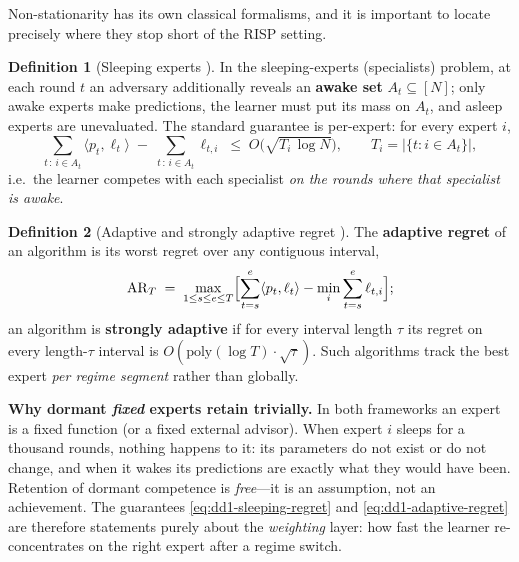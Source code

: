 \documentclass[11pt,a4paper]{article}
\theoremstyle{definition}
\newtheorem{definition}{Definition}[section]
\theoremstyle{plain}
\newcommand{\nm}{\textsc{RISP}}
\begin{document}
Non-stationarity has its own classical formalisms, and it is important to
locate precisely where they stop short of the \nm{} setting.

\begin{definition}[Sleeping experts \cite{freund1997sleeping}]
\label{def:dd1-sleeping}
In the sleeping-experts (specialists) problem, at each round $t$ an
adversary additionally reveals an \textbf{awake set} $A_t \subseteq [N]$;
only awake experts make predictions, the learner must put its mass on $A_t$,
and asleep experts are unevaluated. The standard guarantee is per-expert: for
every expert $i$,
\begin{equation}
\label{eq:dd1-sleeping-regret}
\sum_{t \,:\, i \in A_t} \langle p_t, \ell_t \rangle
\;-\; \sum_{t \,:\, i \in A_t} \ell_{t,i}
\;\le\; O\bigl( \sqrt{ T_i \,\log N } \bigr),
\qquad T_i = |\{ t : i \in A_t \}|,
\end{equation}
i.e.\ the learner competes with each specialist \emph{on the rounds where
that specialist is awake}.
\end{definition}

\begin{definition}[Adaptive and strongly adaptive regret
\cite{hazan2009adaptive, daniely2015strongly}]
\label{def:dd1-adaptive}
The \textbf{adaptive regret} of an algorithm is its worst regret over any
contiguous interval,
\begin{equation}
\label{eq:dd1-adaptive-regret}
\mathrm{AR}_T \;=\; \max_{1 \le s \le e \le T}
\Bigl[ \sum_{t=s}^{e} \langle p_t, \ell_t \rangle
- \min_{i} \sum_{t=s}^{e} \ell_{t,i} \Bigr];
\end{equation}
an algorithm is \textbf{strongly adaptive} \cite{daniely2015strongly} if for
every interval length $\tau$ its regret on every length-$\tau$ interval is
$O(\mathrm{poly}(\log T) \cdot \sqrt{\tau})$. Such algorithms track the best
expert \emph{per regime segment} rather than globally.
\end{definition}

\begin{keypoint}
\textbf{Why dormant \emph{fixed} experts retain trivially.} In both
frameworks an expert is a fixed function (or a fixed external advisor). When
expert $i$ sleeps for a thousand rounds, nothing happens to it: its
parameters do not exist or do not change, and when it wakes its predictions
are exactly what they would have been. Retention of dormant competence is
\emph{free}---it is an assumption, not an achievement. The guarantees
\eqref{eq:dd1-sleeping-regret} and \eqref{eq:dd1-adaptive-regret} are
therefore statements purely about the \emph{weighting} layer: how fast the
learner re-concentrates on the right expert after a regime switch.
\end{keypoint}
\end{document}
